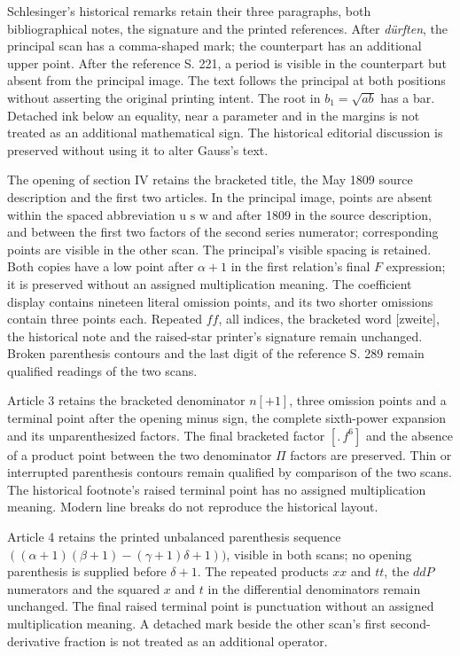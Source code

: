 \par Schlesinger’s historical remarks retain their three paragraphs, both bibliographical notes, the signature and the printed references. After \emph{dürften}, the principal scan has a comma-shaped mark; the counterpart has an additional upper point. After the reference S. 221, a period is visible in the counterpart but absent from the principal image. The text follows the principal at both positions without asserting the original printing intent. The root in $b_1=\sqrt{ab}$ has a bar. Detached ink below an equality, near a parameter and in the margins is not treated as an additional mathematical sign. The historical editorial discussion is preserved without using it to alter Gauss’s text.

\par The opening of section IV retains the bracketed title, the May 1809 source description and the first two articles. In the principal image, points are absent within the spaced abbreviation $\text{u s w}$ and after 1809 in the source description, and between the first two factors of the second series numerator; corresponding points are visible in the other scan. The principal’s visible spacing is retained. Both copies have a low point after $\alpha+1$ in the first relation’s final $F$ expression; it is preserved without an assigned multiplication meaning. The coefficient display contains nineteen literal omission points, and its two shorter omissions contain three points each. Repeated $ff$, all indices, the bracketed word [zweite], the historical note and the raised-star printer’s signature remain unchanged. Broken parenthesis contours and the last digit of the reference S. 289 remain qualified readings of the two scans.

\par Article 3 retains the bracketed denominator $n[+1]$, three omission points and a terminal point after the opening minus sign, the complete sixth-power expansion and its unparenthesized factors. The final bracketed factor $[{.}\,f^6]$ and the absence of a product point between the two denominator $\Pi$ factors are preserved. Thin or interrupted parenthesis contours remain qualified by comparison of the two scans. The historical footnote’s raised terminal point has no assigned multiplication meaning. Modern line breaks do not reproduce the historical layout.

\par Article 4 retains the printed unbalanced parenthesis sequence $((\alpha+1)(\beta+1)-(\gamma+1)\delta+1))$, visible in both scans; no opening parenthesis is supplied before $\delta+1$. The repeated products $xx$ and $tt$, the $ddP$ numerators and the squared $x$ and $t$ in the differential denominators remain unchanged. The final raised terminal point is punctuation without an assigned multiplication meaning. A detached mark beside the other scan’s first second-derivative fraction is not treated as an additional operator.

